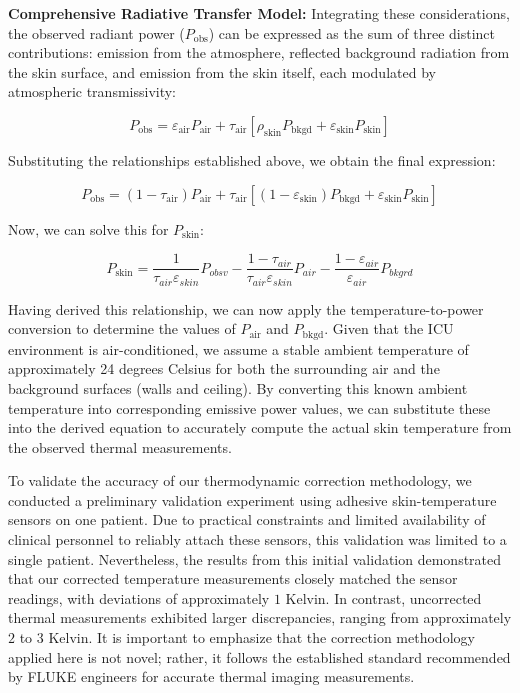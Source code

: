 \vspace{1ex}
\noindent \textbf{Comprehensive Radiative Transfer Model:} Integrating these considerations, the observed radiant power ($P_{\text{obs}}$) can be expressed as the sum of three distinct contributions: emission from the atmosphere, reflected background radiation from the skin surface, and emission from the skin itself, each modulated by atmospheric transmissivity:

\begin{equation}
  P_{\text{obs}} = \varepsilon_{\text{air}} P_{\text{air}} + \tau_{\text{air}} \left[ \rho_{\text{skin}} P_{\text{bkgd}} + \varepsilon_{\text{skin}} P_{\text{skin}} \right]
\end{equation}

Substituting the relationships established above, we obtain the final expression:

\begin{equation}
  P_{\text{obs}} = (1 - \tau_{\text{air}}) P_{\text{air}} + \tau_{\text{air}} \left[ (1 - \varepsilon_{\text{skin}}) P_{\text{bkgd}} + \varepsilon_{\text{skin}} P_{\text{skin}} \right]
\end{equation}

Now, we can solve this for $P_{\text{skin}}$:

\begin{equation}
  P_{\text{skin}} = \frac{1}{\tau_{air} \varepsilon_{skin}} P_{obsv} - \frac{1 - \tau_{air}}{\tau_{air}\varepsilon_{skin}}P_{air} - \frac{1 - \varepsilon_{air}}{\varepsilon_{air}} P_{bkgrd}
\end{equation}

Having derived this relationship, we can now apply the temperature-to-power conversion to determine the values of $P_{\text{air}}$ and $P_{\text{bkgd}}$. Given that the ICU environment is air-conditioned, we assume a stable ambient temperature of approximately 24 degrees Celsius for both the surrounding air and the background surfaces (walls and ceiling). By converting this known ambient temperature into corresponding emissive power values, we can substitute these into the derived equation to accurately compute the actual skin temperature from the observed thermal measurements.

To validate the accuracy of our thermodynamic correction methodology, we conducted a preliminary validation experiment using adhesive skin-temperature sensors on one patient. Due to practical constraints and limited availability of clinical personnel to reliably attach these sensors, this validation was limited to a single patient. Nevertheless, the results from this initial validation demonstrated that our corrected temperature measurements closely matched the sensor readings, with deviations of approximately $1$ Kelvin. In contrast, uncorrected thermal measurements exhibited larger discrepancies, ranging from approximately $2$ to $3$ Kelvin. It is important to emphasize that the correction methodology applied here is not novel; rather, it follows the established standard recommended by FLUKE engineers for accurate thermal imaging measurements.

